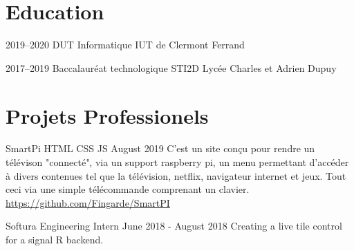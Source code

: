 \documentclass[]{cv-style}          %
\begin{document}

\section{Education}

\begin{entrylist}
\entry
{2019--2020}
{DUT Informatique}
{IUT de Clermont Ferrand}
{\vspace{-0.3cm}}

\entry
{2017--2019}
{Baccalauréat technologique {\normalfont STI2D}}
{Lycée Charles et Adrien Dupuy}
{\vspace{-0.3cm}}
\end{entrylist}


\section{ Projets Professionels}

\begin{entrylist}
\entry
{SmartPi}
{HTML CSS JS}
{August 2019}
{C'est un site conçu pour rendre un télévison "connecté", via un support raspberry pi, un menu permettant d'accéder à divers contenues tel que la télévision, netflix, navigateur internet et jeux. Tout ceci via une simple télécommande comprenant un clavier.
\newline
\href{https://github.com/Fingarde/SmartPI}{https://github.com/Fingarde/SmartPI}}
{\vspace{-0.3cm}}
\end{entrylist}

\begin{entrylist}
\entry
{Softura}
{Engineering Intern}
{June 2018 - August 2018}
{Creating a live tile control for a signal R backend. }
{\vspace{-0.3cm}}
\end{entrylist}
\end{document}
